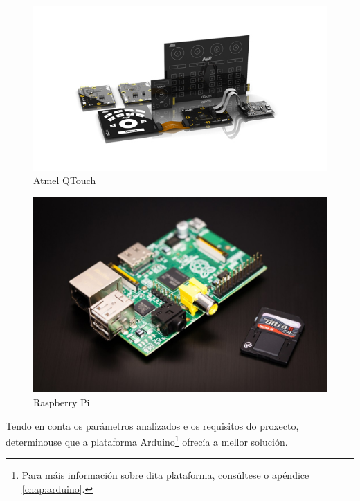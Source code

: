   \begin{figure}[htbp]
   \centering
   \includegraphics[scale=0.7,keepaspectratio=true]{./imagenes/qtouch.jpg}
   \caption{Atmel QTouch}
   \label{figura:QTouch}
  \end{figure}

  \begin{figure}[htbp]
   \centering
   \includegraphics[scale=0.2,keepaspectratio=true]{./imagenes/raspberrypi.jpg}
   \caption{Raspberry Pi}
   \label{figura:RaspberryPi}
  \end{figure}

  Tendo en conta os parámetros analizados e os requisitos do proxecto,
  determinouse que a plataforma Arduino\footnote{Para máis información sobre
  dita plataforma, consúltese o apéndice \ref{chap:arduino}.} ofrecía a mellor
  solución. \\

